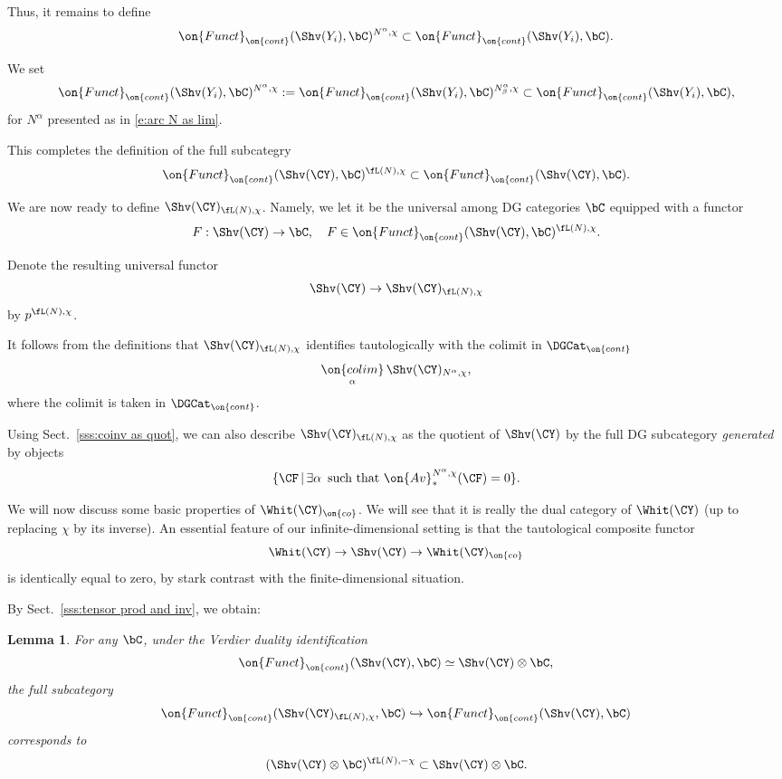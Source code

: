 \documentclass[9pt]{amsart}
\newtheorem{lem}[subsubsection]{Lemma}
\theoremstyle{definition}
\theoremstyle{remark}
\newcommand{\secref}[1]{Sect.~\ref{#1}}
\numberwithin{equation}{section}
\begin{document}
Thus, it remains to define
$$\on{Funct}_{\on{cont}}(\Shv(Y_i),\bC)^{N^\alpha,\chi} \subset \on{Funct}_{\on{cont}}(\Shv(Y_i),\bC).$$

We set $$\on{Funct}_{\on{cont}}(\Shv(Y_i),\bC)^{N^\alpha,\chi}:=
\on{Funct}_{\on{cont}}(\Shv(Y_i),\bC)^{N^\alpha_\beta,\chi}\subset \on{Funct}_{\on{cont}}(\Shv(Y_i),\bC),$$
for $N^\alpha$ presented as in \eqref{e:arc N as lim}.

\medskip

This completes the definition of the full subcategry
$$\on{Funct}_{\on{cont}}(\Shv(\CY),\bC)^{\fL(N),\chi}\subset
\on{Funct}_{\on{cont}}(\Shv(\CY),\bC).$$ 

\sssec{}

We are now ready to define $\Shv(\CY)_{\fL(N),\chi}$. Namely, we let it be the universal among DG categories $\bC$ equipped with a functor 
$$F:\Shv(\CY)\to \bC, \quad F\in \on{Funct}_{\on{cont}}(\Shv(\CY),\bC)^{\fL(N),\chi}.$$

\medskip

Denote the resulting universal functor
$$\Shv(\CY)\to \Shv(\CY)_{\fL(N),\chi}$$
by $p^{\fL(N),\chi}$.

\sssec{}

It follows from the definitions that $\Shv(\CY)_{\fL(N),\chi}$ identifies tautologically with the colimit in $\DGCat_{\on{cont}}$ 
$$\underset{\alpha}{\on{colim}}\, \Shv(\CY)_{N^\alpha,\chi},$$
where the colimit is taken in $\DGCat_{\on{cont}}$. 

\sssec{}

Using \secref{sss:coinv as quot}, we can also describe $\Shv(\CY)_{\fL(N),\chi}$ as the quotient of $\Shv(\CY)$
by the full DG subcategory \emph{generated} by objects
$$\{\CF\,|\, \exists \alpha\, \text{ such that } \on{Av}^{N^\alpha,\chi}_*(\CF)=0\}.$$


We will now discuss some basic properties of $\Whit(\CY)_{\on{co}}$. We will see that it is really the dual category
of $\Whit(\CY)$ (up to replacing $\chi$ by its inverse). An essential feature of our infinite-dimensional setting
is that the tautological composite functor
$$\Whit(\CY)\to \Shv(\CY)\to \Whit(\CY)_{\on{co}}$$
is identically equal to zero, by stark contrast with the finite-dimensional situation. 

\sssec{}

By \secref{sss:tensor prod and inv}, we obtain:

\begin{lem} \label{l:simple Verdier duality}
For any $\bC$, under the Verdier duality identification
$$\on{Funct}_{\on{cont}}(\Shv(\CY),\bC)\simeq \Shv(\CY)\otimes \bC,$$
the full subcategory
$$\on{Funct}_{\on{cont}}(\Shv(\CY)_{\fL(N),\chi},\bC)\hookrightarrow \on{Funct}_{\on{cont}}(\Shv(\CY),\bC)$$
corresponds to 
$$(\Shv(\CY)\otimes \bC)^{\fL(N),-\chi}\subset \Shv(\CY)\otimes \bC.$$
\end{lem} 
\end{document}
